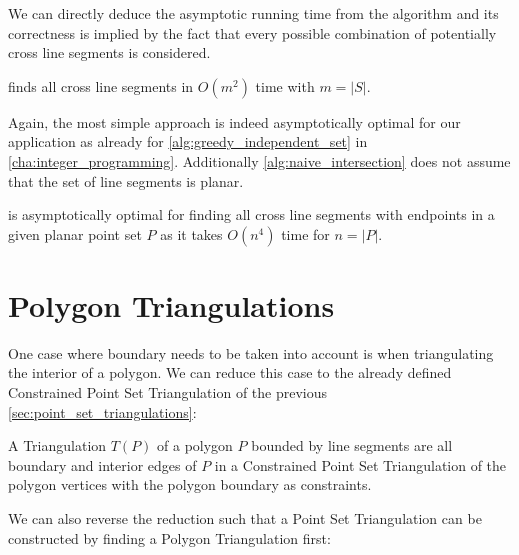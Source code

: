We can directly deduce the asymptotic running time from the algorithm
and its correctness is implied by the fact that every possible
combination of potentially \gls{cross} line segments is considered.

\begin{theorem}
   finds all \gls{cross} line segments
  in \(O(m^2)\) time with \(m = |S|\).  
\end{theorem}

Again, the most simple approach is indeed asymptotically optimal for
our application as already for \cref{alg:greedy_independent_set} in
\cref{cha:integer_programming}. Additionally
\cref{alg:naive_intersection} does not assume that the set of line
segments is planar.

\begin{theorem}
   is asymptotically optimal
  for finding all \gls{cross} line segments
  with endpoints in a given planar point set \(P\)
  as it takes \(O(n^4)\) time for \(n = |P|\).
\end{theorem}

\section{Polygon Triangulations}
One case where boundary needs to be taken into account is when
triangulating the interior of a polygon. We can reduce this case to
the already defined Constrained Point Set Triangulation of the
previous \cref{sec:point_set_triangulations}:

\begin{definition}
  A Triangulation \(T(P)\) of a polygon \(P\) bounded by line segments
  are all boundary and interior edges of \(P\)
  in a Constrained Point Set Triangulation of the polygon vertices
  with the polygon boundary as constraints.
\end{definition}

We can also reverse the reduction such that a Point Set Triangulation
can be constructed by finding a Polygon Triangulation first:

